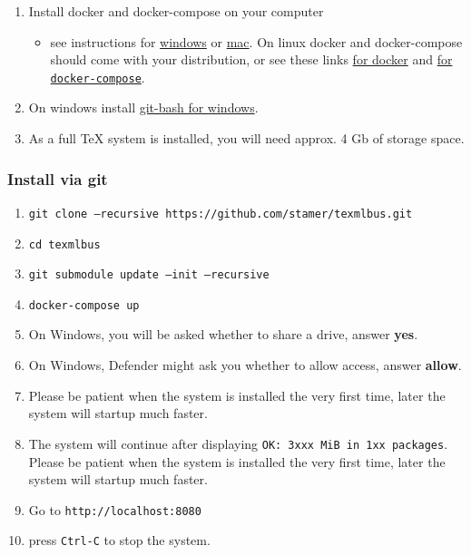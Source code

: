 \documentclass[a4paper]{article}
\begin{document}
\begin{enumerate}
\item Install docker and docker-compose on your computer
	\begin{itemize}
	\item see instructions for 
	\href{https://docs.docker.com/docker-for-windows/install/}{windows} or \href{https://docs.docker.com/docker-for-mac/install/}{mac}. On linux docker and docker-compose should come with your distribution, or see these links  \href{https://docs.docker.com/install/#server}{for docker} and \href{https://docs.docker.com/compose/install}{for \texttt{docker-compose}}.
	\end{itemize}
	
\item On windows install \href{https://gitforwindows.org/}{git-bash for windows}.

\item As a full \TeX{} system is installed, you will need approx. 4 Gb of storage space.

\end{enumerate}

\subsubsection{Install via git}
\begin{enumerate}
\item \texttt{git clone --recursive https://github.com/stamer/texmlbus.git}
\item \texttt{cd texmlbus}
\item \texttt{git submodule update --init --recursive}
\item \texttt{docker-compose up}
\item On Windows,  you will be asked whether to share a drive, answer \textbf{yes}. 
\item On Windows, Defender might ask you whether to allow access, answer \textbf{allow}.
\item Please be patient when the system is installed the very first time, later the system will startup much faster. 
\item The system will continue after displaying \texttt{OK: 3xxx MiB in 1xx packages}. Please be patient when the system is installed the very first time, later the system will startup much faster.
\item Go to \texttt{http://localhost:8080}
\item press \texttt{Ctrl-C} to stop the system.
\end{enumerate}
\end{document}
